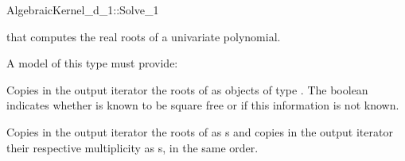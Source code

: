 \begin{ccRefConcept}{AlgebraicKernel_d_1::Solve_1}

\ccDefinition

 that computes the real roots of a univariate polynomial. 
 

A model of this type must provide:

{Copies in the output iterator the roots of  as objects of type 
. The boolean indicates whether  is known 
to be square free or if this information is not known.} 

{Copies in the output iterator  the roots of  as 
s and copies in the output iterator  
their respective multiplicity as s, in the same order.}

\end{ccRefConcept}
